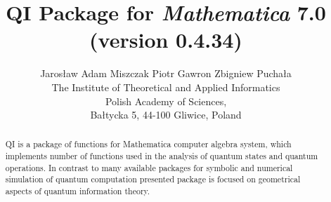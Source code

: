 \documentclass[a4paper,10pt]{scrartcl}
\begin{document}
\title{QI Package for \emph{Mathematica} 7.0 \\(version 0.4.34)}\author{Jaros{\l}aw Adam Miszczak \quad Piotr Gawron \quad Zbigniew Pucha{\l}a\\
{The Institute of Theoretical and Applied Informatics}\\
{Polish Academy of Sciences},\\
{Ba{\l}tycka 5, 44-100 Gliwice, Poland}}
\maketitle
\begin{abstract}QI is a package of functions for Mathematica computer algebra system, which implements number of functions used in the analysis of quantum states and quantum operations. In contrast to many available packages for symbolic and numerical simulation of quantum computation presented package is focused on geometrical aspects of quantum information theory.\end{abstract}

 
 
\end{document}

